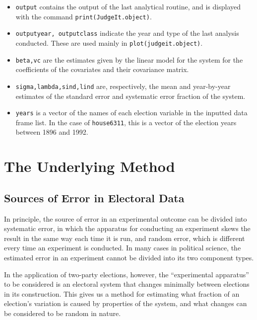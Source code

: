 \documentclass[oneside,letterpaper,titlepage]{article}
\begin{document}
\begin{itemize}
\item \texttt{output} contains the output of the last analytical
  routine, and is displayed with the command
  \texttt{print(JudgeIt.object)}.

\item \texttt{outputyear, outputclass} indicate the year and type of
  the last analysis conducted. These are used mainly in
  \texttt{plot(judgeit.object)}.

\item \texttt{beta,vc} are the estimates given by the linear model for
  the system for the coefficients of the covariates and their
  covariance matrix.

\item \texttt{sigma,lambda,sind,lind} are, respectively, the mean and
  year-by-year estimates of the standard error and systematic error
  fraction of the system.

\item \texttt{years} is a vector of the names of each election
  variable in the inputted data frame list. In the case of
  \texttt{house6311}, this is a vector of the election years between
  1896 and 1992.

\end{itemize}

\appendix

\section{The Underlying Method}

\subsection*{Sources of Error in Electoral Data}
In principle, the source of error in an experimental outcome can be divided into systematic error, in which the apparatus for conducting an experiment skews the result in the same way each time it is run, and random error, which is different every time an experiment is conducted. In many cases in political science, the estimated error in an experiment cannot be divided into its two component types.

In the application of two-party elections, however, the ``experimental apparatus'' to be considered is an electoral system that changes minimally between elections in its construction. This gives us a method for estimating what fraction of an election's variation is caused by properties of the system, and what changes can be considered to be random in nature.
\end{document}
